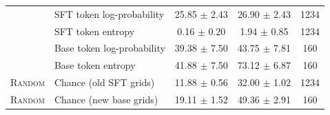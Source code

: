 \begin{table}[t]
\begin{tabular}{llccc}
 & SFT token log-probability & 25.85 $\pm$ 2.43 & 26.90 $\pm$ 2.43 & 1234 \\
 & SFT token entropy & 0.16 $\pm$ 0.20 & 1.94 $\pm$ 0.85 & 1234 \\
 & Base token log-probability & 39.38 $\pm$ 7.50 & 43.75 $\pm$ 7.81 & 160 \\
 & Base token entropy & 41.88 $\pm$ 7.50 & 73.12 $\pm$ 6.87 & 160 \\
\midrule
\textsc{Random} & Chance (old SFT grids) & 11.88 $\pm$ 0.56 & 32.00 $\pm$ 1.02 & 1234 \\
\textsc{Random} & Chance (new base grids) & 19.11 $\pm$ 1.52 & 49.36 $\pm$ 2.91 & 160 \\
\bottomrule
\end{tabular}
\end{table}
